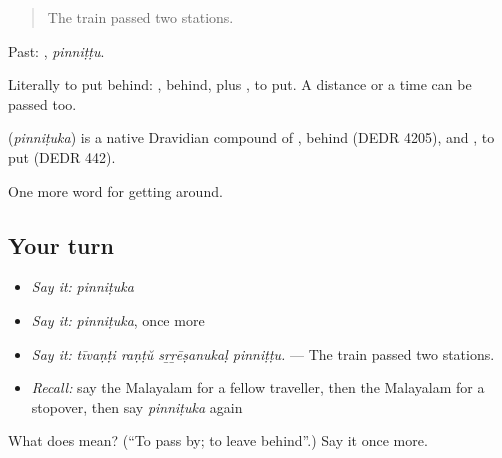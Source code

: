 \begin{quote}
The train passed two stations.
\end{quote}

Past: , \emph{pinniṭṭu}.

Literally to put behind: , behind, plus , to put. A distance or a time can be passed too.

\begin{cousinweb}
\textbf{} (\emph{pinniṭuka}) is a native Dravidian compound of , behind (DEDR 4205), and , to put (DEDR 442).
\end{cousinweb}

\begin{grammarlens}[title={What you've built}]
One more word for getting around.
\end{grammarlens}

\subsection*{Your turn}
\begin{itemize}
\raggedright
  \item \emph{Say it:} \emph{pinniṭuka}
  \item \emph{Say it:} \emph{pinniṭuka}, once more
  \item \emph{Say it:} \emph{tīvaṇṭi raṇṭŭ sṟṟēṣanukaḷ pinniṭṭu.} — The train passed two stations.
  \item \emph{Recall:} say the Malayalam for a fellow traveller, then the Malayalam for a stopover, then say \emph{pinniṭuka} again
\end{itemize}

\begin{tcolorbox}[breakable,colback=teal!4,colframe=teal!35!black,title={Before you move on}]
What does  mean? (\textquotedblleft{}To pass by; to leave behind\textquotedblright{}.) Say it once more.
\end{tcolorbox}
